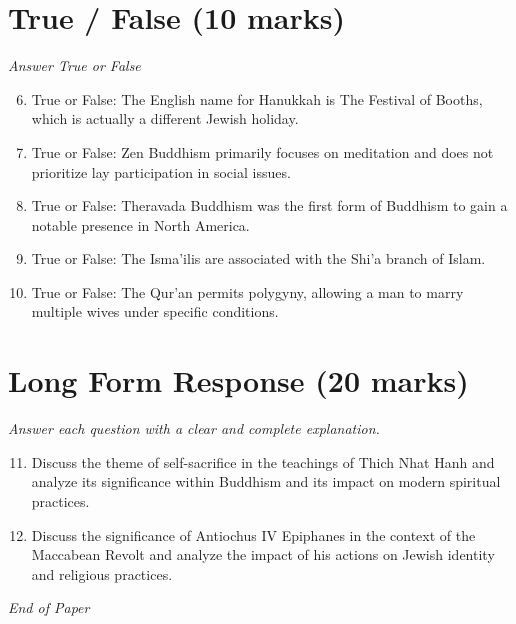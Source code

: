 \documentclass[12pt]{article}
\begin{document}
\section*{True / False (10 marks)}
\textit{Answer True or False}
\begin{enumerate}[label=\arabic*.]
\setcounter{enumi}{5}
\item True or False: The English name for Hanukkah is The Festival of Booths, which is actually a different Jewish holiday.
\item True or False: Zen Buddhism primarily focuses on meditation and does not prioritize lay participation in social issues.
\item True or False: Theravada Buddhism was the first form of Buddhism to gain a notable presence in North America.
\item True or False: The Isma'ilis are associated with the Shi'a branch of Islam.
\item True or False: The Qur'an permits polygyny, allowing a man to marry multiple wives under specific conditions.
\end{enumerate}

\section*{Long Form Response (20 marks)}
\textit{Answer each question with a clear and complete explanation.}
\begin{enumerate}[label=\arabic*.]
\setcounter{enumi}{10}
\item Discuss the theme of self-sacrifice in the teachings of Thich Nhat Hanh and analyze its significance within Buddhism and its impact on modern spiritual practices.
\item Discuss the significance of Antiochus IV Epiphanes in the context of the Maccabean Revolt and analyze the impact of his actions on Jewish identity and religious practices.
\end{enumerate}

\vfill
\noindent\textit{End of Paper}
\end{document}
